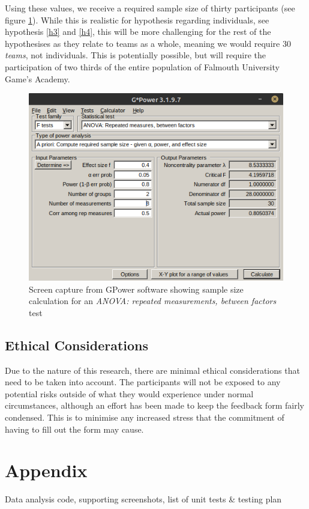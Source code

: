 \documentclass[lettersize,journal]{IEEEtran}
\begin{document}
        Using these values, we receive a required sample size of thirty participants (see figure \ref{ANOVArepeatedbetween}). While this is realistic for hypothesis regarding individuals, see hypothesis \ref{h3} and \ref{h4}, this will be more challenging for the rest of the hypothesises as they relate to teams as a whole, meaning we would require 30 \textit{teams}, not individuals. This is potentially possible, but will require the participation of two thirds of the entire population of Falmouth University Game's Academy.

        \begin{figure}[h!]
            \includegraphics[width=\columnwidth]{Images/ANOVA_2.png}
            \caption{Screen capture from GPower software showing sample size calculation for an \textit{ANOVA: repeated measurements, between factors} test}
            \label{ANOVArepeatedbetween}
        \end{figure}

    \subsection{Ethical Considerations}
        Due to the nature of this research, there are minimal ethical considerations that need to be taken into account. The participants will not be exposed to any potential risks outside of what they would experience under normal circumstances, although an effort has been made to keep the feedback form fairly condensed. This is to minimise any increased stress that the commitment of having to fill out the form may cause.
    
    \section{Appendix}
    Data analysis code, supporting screenshots, list of unit tests \& testing plan
\end{document}
